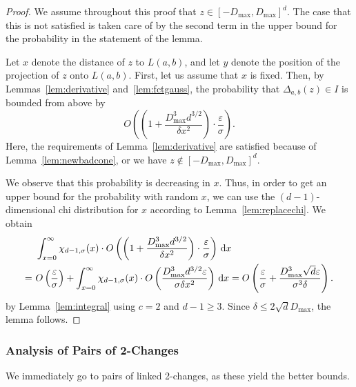 \documentclass[11pt,DIV=12,a4paper]{scrartcl}
\newcommand{\eps}{\varepsilon}
\newcommand{\maxx}{D_{\max}}
\begin{document}
\begin{proof}
We assume throughout this proof that $z \in [-\maxx, \maxx]^d$. The case that this is not satisfied is taken care of by the
second term in the upper bound for the probability in the statement of the lemma.

Let $x$ denote the distance of $z$ to $L(a,b)$, and let $y$ denote the position
of the projection of $z$ onto $L(a,b)$.
First, let us assume that $x$ is fixed. Then, by Lemmas~\ref{lem:derivative}
and~\ref{lem:fctgauss}, the probability that
$\Delta_{a,b}(z) \in I$ is bounded from above by
\[
  O\left(\left(1 + \frac{\maxx^3d^{3/2}}{\delta x^2}\right) \cdot \frac{\eps}{\sigma}\right).
\]
Here, the requirements of Lemma~\ref{lem:derivative} are satisfied because of Lemma~\ref{lem:newbadcone}, or we have $z \notin [-\maxx, \maxx]^d$.

We observe that this probability is decreasing in $x$.
Thus, in order to get an upper bound for the probability with random $x$, we can use the $(d-1)$-dimensional chi distribution
for $x$ according to Lemma~\ref{lem:replacechi}.
We obtain
\begin{align*}
& \int_{x=0}^\infty \chi_{d-1, \sigma}(x) \cdot O\left(\left(1 + \frac{\maxx^3d^{3/2}}{\delta x^2}\right) \cdot \frac{\eps}{\sigma}\right) \, \text d x \\
= ~ & O\left(\frac \eps\sigma\right) + 
\int_{x=0}^\infty \chi_{d-1, \sigma}(x) \cdot O\left(\frac{\maxx^3d^{3/2}\eps}{\sigma\delta x^2}\right)  \, \textup d x 
= O\left(\frac \eps\sigma  +\frac{\maxx^3 \sqrt d \eps}{\sigma^3 \delta}    \right).
\end{align*}
by Lemma~\ref{lem:integral} using $c = 2$ and $d-1 \geq 3$.
Since $\delta \leq 2 \sqrt d \maxx$, the lemma follows.
\end{proof}

\subsubsection{Analysis of Pairs of 2-Changes}

We immediately go to pairs of linked 2-changes, as these yield the better bounds.
\end{document}
